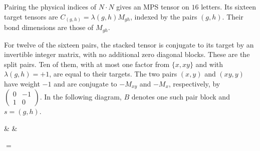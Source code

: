 \begin{definition}%
    \label{def:asymex_z2z2_pairs}
    \leanok
    Pairing the physical indices of $N\cdot N$ gives an MPS tensor
    on $16$ letters. Its sixteen target tensors are
    $C_{(g,h)}=\lambda(g,h)M_{gh}$, indexed by the pairs $(g,h)$.
    Their bond dimensions are those of $M_{gh}$.
\end{definition}

For twelve of the sixteen pairs, the stacked tensor is conjugate to
its target by an invertible integer matrix, with no additional zero
diagonal blocks. These are the split pairs.
Ten of them, with at most one factor from $\{x,xy\}$ and with
$\lambda(g,h)=+1$, are equal to their targets.
The two pairs $(x,y)$ and $(xy,y)$ have weight $-1$ and are conjugate
to $-M_{xy}$ and $-M_x$, respectively, by
$\begin{pmatrix}0&-1\\1&0\end{pmatrix}$.
In the following diagram, $B$ denotes one such pair block and
$s=(g,h)$.

\begin{center}
    \tenkzkernel
    \begin{tenkz}[rows={wire}, cols=3, west=open, east=open]
         &
         &
    \end{tenkz}
    \quad $=$ \quad
    \begin{tenkz}[rows={wire}, cols=1, west=open, east=open]
    \end{tenkz}
\end{center}

